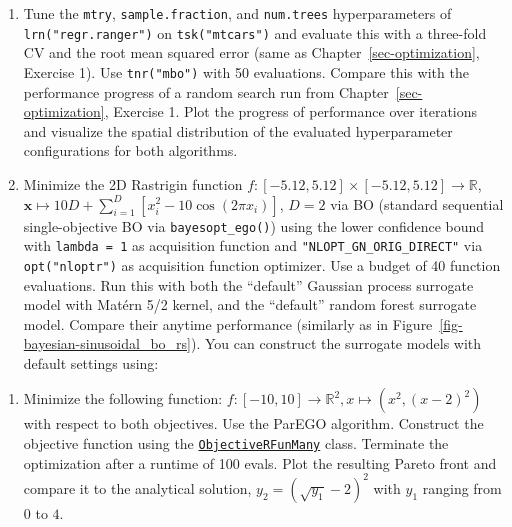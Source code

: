\begin{enumerate}
\def\labelenumi{\arabic{enumi}.}
\tightlist
\item
  Tune the \texttt{mtry}, \texttt{sample.fraction}, and
  \texttt{num.trees} hyperparameters of \texttt{lrn("regr.ranger")} on
  \texttt{tsk("mtcars")} and evaluate this with a three-fold CV and the
  root mean squared error (same as Chapter~\ref{sec-optimization},
  Exercise 1). Use \texttt{tnr("mbo")} with 50 evaluations. Compare this
  with the performance progress of a random search run from
  Chapter~\ref{sec-optimization}, Exercise 1. Plot the progress of
  performance over iterations and visualize the spatial distribution of
  the evaluated hyperparameter configurations for both algorithms.
\item
  Minimize the 2D Rastrigin function
  \(f: [-5.12, 5.12] \times [-5.12, 5.12] \rightarrow \mathbb{R}\),
  \(\mathbf{x} \mapsto 10 D+\sum_{i=1}^D\left[x_i^2-10 \cos \left(2 \pi x_i\right)\right]\),
  \(D = 2\) via BO (standard sequential single-objective BO via
  \texttt{bayesopt\_ego()}) using the lower confidence bound with
  \texttt{lambda\ =\ 1} as acquisition function and
  \texttt{"NLOPT\_GN\_ORIG\_DIRECT"} via \texttt{opt("nloptr")} as
  acquisition function optimizer. Use a budget of 40 function
  evaluations. Run this with both the ``default'' Gaussian process
  surrogate model with Matérn 5/2 kernel, and the ``default'' random
  forest surrogate model. Compare their anytime performance (similarly
  as in Figure~\ref{fig-bayesian-sinusoidal_bo_rs}). You can construct
  the surrogate models with default settings using:
\end{enumerate}

\begin{Shaded}
\begin{Highlighting}[]
\OtherTok{=} \NormalTok{(}\NormalTok{())}
\OtherTok{=} \NormalTok{(}\NormalTok{())}
\end{Highlighting}
\end{Shaded}

\begin{enumerate}
\def\labelenumi{\arabic{enumi}.}
\setcounter{enumi}{2}
\tightlist
\item
  Minimize the following function:
  \(f: [-10, 10] \rightarrow \mathbb{R}^2, x \mapsto \left(x^2, (x - 2)^2\right)\)
  with respect to both objectives. Use the ParEGO algorithm. Construct
  the objective function using the
  \href{https://bbotk.mlr-org.com/reference/ObjectiveRFunMany.html}{\texttt{ObjectiveRFunMany}}
  class. Terminate the optimization after a runtime of 100 evals. Plot
  the resulting Pareto front and compare it to the analytical solution,
  \(y_2 = \left(\sqrt{y_1}-2\right)^2\) with \(y_1\) ranging from \(0\)
  to \(4\).
\end{enumerate}
